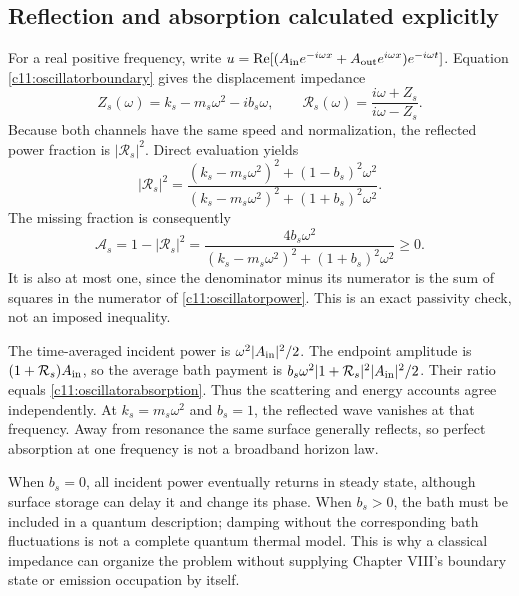 \subsection{Reflection and absorption calculated explicitly}
For a real positive frequency, write $u=\operatorname{Re}[(A_{\rm in}e^{-i\omega x}+A_{\rm out}e^{i\omega x})e^{-i\omega t}]$. Equation \eqref{c11:oscillatorboundary} gives the displacement impedance
\begin{equation}
 Z_s(\omega)=k_s-m_s\omega^2-i b_s\omega,
 \qquad
 \mathcal R_s(\omega)=\frac{i\omega+Z_s}{i\omega-Z_s}.
 \label{c11:oscillatorR}
\end{equation}
Because both channels have the same speed and normalization, the reflected power fraction is $|\mathcal R_s|^2$. Direct evaluation yields
\begin{equation}
 |\mathcal R_s|^2=
 \frac{(k_s-m_s\omega^2)^2+(1-b_s)^2\omega^2}
 {(k_s-m_s\omega^2)^2+(1+b_s)^2\omega^2}.
 \label{c11:oscillatorpower}
\end{equation}
The missing fraction is consequently
\begin{equation}
 \mathcal A_s=1-|\mathcal R_s|^2
 =\frac{4b_s\omega^2}
 {(k_s-m_s\omega^2)^2+(1+b_s)^2\omega^2}\geq0.
 \label{c11:oscillatorabsorption}
\end{equation}
It is also at most one, since the denominator minus its numerator is the sum of squares in the numerator of \eqref{c11:oscillatorpower}. This is an exact passivity check, not an imposed inequality.

The time-averaged incident power is $\omega^2|A_{\rm in}|^2/2$. The endpoint amplitude is $(1+\mathcal R_s)A_{\rm in}$, so the average bath payment is $b_s\omega^2|1+\mathcal R_s|^2|A_{\rm in}|^2/2$. Their ratio equals \eqref{c11:oscillatorabsorption}. Thus the scattering and energy accounts agree independently. At $k_s=m_s\omega^2$ and $b_s=1$, the reflected wave vanishes at that frequency. Away from resonance the same surface generally reflects, so perfect absorption at one frequency is not a broadband horizon law.

When $b_s=0$, all incident power eventually returns in steady state, although surface storage can delay it and change its phase. When $b_s>0$, the bath must be included in a quantum description; damping without the corresponding bath fluctuations is not a complete quantum thermal model. This is why a classical impedance can organize the problem without supplying Chapter VIII's boundary state or emission occupation by itself.

